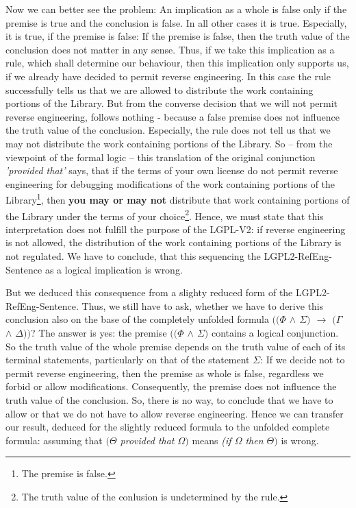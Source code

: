 Now we can better see the problem: An implication as a whole is false only if
the premise is true and the conclusion is false. In all other cases it is true.
Especially, it is true, if the premise is false: If the premise is false, then
the truth value of the conclusion does not matter in any sense. Thus, if we take
this implication as a rule, which shall determine our behaviour, then this
implication only supports us, if we already have decided to permit reverse
engineering. In this case the rule successfully tells us that we are allowed to
distribute the work containing portions of the Library. But from the converse
decision that we will not permit reverse engineering, follows nothing - because
a false premise does not influence the truth value of the conclusion.
Especially, the rule does not tell us that we may not distribute the work
containing portions of the Library. So -- from the viewpoint of the formal logic
-- this translation of the original conjunction \emph{'provided that'} says,
that if the terms of your own license do not permit reverse engineering for
debugging modifications of the work containing portions of the
Library\footnote{The premise is false.}, then \textbf{you may or may not}
distribute that work containing portions of the Library under the terms of your
choice\footnote{The truth value of the conlusion is undetermined by the rule.}.
Hence, we must state that this interpretation does not fulfill the purpose of
the LGPL-V2: if reverse engineering is not allowed, the distribution of the work
containing portions of the Library is not regulated. We have to conclude, that
this sequencing the LGPL2-RefEng-Sentence as a logical implication is wrong.

But we deduced this consequence from a slighty reduced form of the
LGPL2-RefEng-Sentence. Thus, we still have to ask, whether we have to derive
this conclusion also on the base of the completely unfolded formula
\emph{$((\Phi$ $\wedge$ $\Sigma)$ $\rightarrow$ $(\Gamma$ $\wedge$ $\Delta))$}?
The answer is yes: the premise \emph{$((\Phi$ $\wedge$ $\Sigma)$} contains a
logical conjunction. So the truth value of the whole premise depends on the
truth value of each of its terminal statements, particularly on that of the
statement $\Sigma$: If we decide not to permit reverse engineering, then the
premise as whole is false, regardless we forbid or allow modifications.
Consequently, the premise does not influence the truth value of the conclusion.
So, there is no way, to conclude that we have to allow or that we do not have to
allow reverse engineering. Hence we can transfer our result, deduced for the
slightly reduced formula to the unfolded complete formula: assuming that
\emph{$(\Theta$ provided that $\Omega)$} means \emph{(if $\Omega$ then
$\Theta)$} is wrong.

